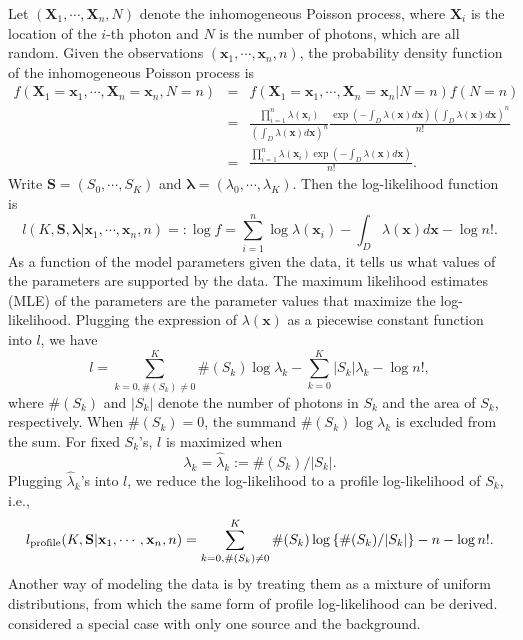 \documentclass{aastex61}
\begin{document}
Let $(\mathbf{X}_1, \cdots, \mathbf{X}_n, N)$ denote the inhomogeneous Poisson process, where $\mathbf{X}_i$ is the location of the $i$-th photon and $N$ is the number of photons, which are all random. Given the observations $(\mathbf{x}_1, \cdots, \mathbf{x}_n, n)$, the probability density function of the inhomogeneous Poisson process is 
\begin{eqnarray*}
f(\mathbf{X}_1=\mathbf{x}_1, \cdots, \mathbf{X}_n=\mathbf{x}_n, N=n) & = & f(\mathbf{X}_1=\mathbf{x}_1, \cdots, \mathbf{X}_n=\mathbf{x}_n | N=n)f(N=n)\\
& = & \frac{\prod_{i=1}^n \lambda(\mathbf{x}_i)}{\left( \int_D \lambda(\mathbf{x}) d\mathbf{x} \right) ^n} \frac{\exp\left({-\int_D\lambda(\mathbf{x})d\mathbf{x}} \right)\left(\int_D\lambda(\mathbf{x})d\mathbf{x}\right)^n}{n!}\\
& = & \frac{\prod_{i=1}^n \lambda(\mathbf{x}_i)\exp\left({-\int_D\lambda(\mathbf{x})d\mathbf{x}} \right)}{n!}.
\end{eqnarray*}
Write $\mathbf{S}=(S_0, \cdots, S_K)$ and $\bm{\lambda}=(\lambda_0, \cdots, \lambda_K)$. Then the log-likelihood function is
$$l(K, \mathbf{S}, \bm{\lambda}|\mathbf{x}_1, \cdots, \mathbf{x}_n, n)=:\log{f}=\sum \limits_{i=1}^n \log{\lambda(\mathbf{x}_i)}-\int_D\lambda(\mathbf{x})d\mathbf{x}-\log{n!}.$$
As a function of the model parameters given the data, it tells us what values of the parameters are supported by the data. The maximum likelihood estimates (MLE) of the parameters are the parameter values that maximize the log-likelihood.
Plugging the expression of $\lambda(\mathbf{x})$ as a piecewise constant function into $l$, we have
$$l=\sum \limits_{k=0, \#(S_k)\neq 0}^K \#(S_k) \log {\lambda_k}-\sum_{k=0}^K |S_k|\lambda_k-\log{n!},$$
where $\#(S_k)$ and $|S_k|$ denote the number of photons in $S_k$ and the area of $S_k$, respectively. When $\#(S_k)=0$, the summand $\#(S_k) \log {\lambda_k}$ is excluded from the sum.
For fixed $S_k$'s, $l$ is maximized when
$$\lambda_k=\widehat{\lambda}_k:=\#(S_k)/|S_k|.$$
Plugging $\widehat{\lambda}_k$'s into $l$, we reduce the log-likelihood to a profile log-likelihood of $S_k$, i.e.,
\begin{equation}\label{eqn:prof_log_lik}
l_{\rm profile}(K, \mathbf{S}|\mathbf{x}_1, \cdots, \mathbf{x}_n, n)=\sum \limits_{k=0, \#(S_k)\neq 0}^K \#(S_k) \log \left\{\#(S_k)/|S_k|\right\}-n-\log{n!}.
\end{equation}
Another way of modeling the data is by treating them as a mixture of uniform distributions, from which the same form of profile log-likelihood can be derived. 
\citet{Allard-97} considered a special case with only one source and the background.
\end{document}
